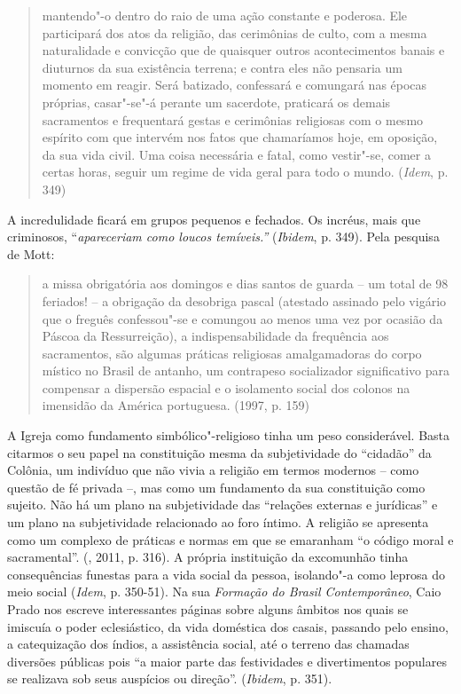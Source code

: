 {\begin{quote}
mantendo"-o dentro do raio de uma ação constante e poderosa. Ele
participará dos atos da religião, das cerimônias de culto, com a mesma
naturalidade e convicção que de quaisquer outros acontecimentos banais e
diuturnos da sua existência terrena; e contra eles não pensaria um
momento em reagir. Será batizado, confessará e comungará nas épocas
próprias, casar"-se"-á perante um sacerdote, praticará os demais
sacramentos e frequentará gestas e cerimônias religiosas com o mesmo
espírito com que intervém nos fatos que chamaríamos hoje, em oposição,
da sua vida civil. Uma coisa necessária e fatal, como vestir"-se, comer a
certas horas, seguir um regime de vida geral para todo o mundo.
(\emph{Idem}, p. 349)
\end{quote}

A incredulidade ficará em grupos pequenos e fechados. Os incréus, mais
que criminosos, ``\emph{apareceriam como loucos
temíveis.''} (\emph{Ibidem}, p. 349). Pela pesquisa de Mott:

\begin{quote}
a missa obrigatória aos domingos e dias santos de guarda -- um total de
98 feriados! -- a obrigação da desobriga pascal (atestado assinado pelo
vigário que o freguês confessou"-se e comungou ao menos uma vez por
ocasião da Páscoa da Ressurreição), a indispensabilidade da frequência
aos sacramentos, são algumas práticas religiosas amalgamadoras do corpo
místico no Brasil de antanho, um contrapeso socializador significativo
para compensar a dispersão espacial e o isolamento social dos colonos na
imensidão da América portuguesa. (1997, p. 159)
\end{quote}

A Igreja como fundamento simbólico"-religioso tinha um peso considerável.
Basta citarmos o seu papel na constituição mesma da subjetividade do
``cidadão'' da Colônia, um indivíduo que não vivia a religião em termos
modernos -- como questão de fé privada --, mas como um fundamento da sua
constituição como sujeito. Não há um plano na subjetividade das
``relações externas e jurídicas'' e um plano na subjetividade
relacionado ao foro íntimo. A religião se apresenta como um complexo de
práticas e normas em que se emaranham ``o código moral e sacramental''.
(, 2011, p. 316). A própria instituição da excomunhão tinha
consequências funestas para a vida social da pessoa, isolando"-a como
leprosa do meio social (\emph{Idem}, p. 350-51). Na sua \emph{Formação
do Brasil Contemporâneo}, Caio Prado nos escreve interessantes páginas
sobre alguns âmbitos nos quais se imiscuía o poder eclesiástico, da vida
doméstica dos casais, passando pelo ensino, a catequização dos índios, a
assistência social, até o terreno das chamadas diversões públicas pois
``a maior parte das festividades e divertimentos populares se realizava
sob seus auspícios ou direção''. (\emph{Ibidem}, p. 351).

}
